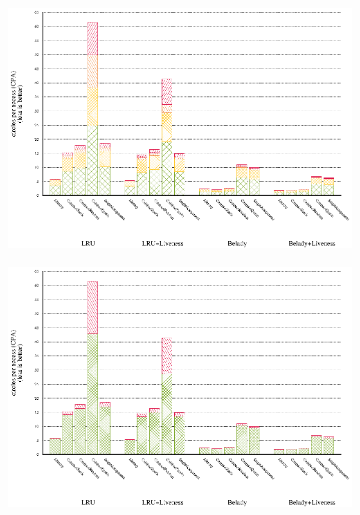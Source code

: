 \documentclass[onecolumn, openright, master, english, signatures]{dbrgrptt}
\begin{document}
\begin{figure}[!ht]
  \begin{subfigure}[b]{0.5\textwidth}%
    \includegraphics[width=\textwidth]{figs/plots/perf-raytrace.eps}
  \end{subfigure}%
  \begin{subfigure}[b]{0.5\textwidth}%
    \includegraphics[width=\textwidth]{figs/plots/perf-misses-raytrace.eps}
  \end{subfigure}%
  \caption{}
  \label{fig:todo}
\end{figure}
\end{document}
